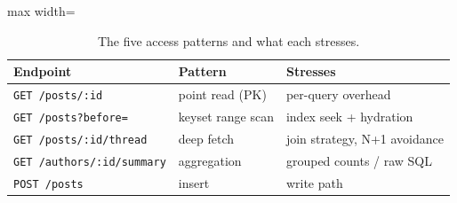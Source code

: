 \begin{table}[htbp]
  \centering
  \caption{The five access patterns and what each stresses.}
  \label{tab:patterns}
  \begin{adjustbox}{max width=\textwidth}
  \begin{tabular}{l l l}
    \toprule
    Endpoint & Pattern & Stresses \\
    \midrule
    \texttt{GET /posts/:id}          & point read (PK)       & per-query overhead \\
    \texttt{GET /posts?before=}      & keyset range scan     & index seek + hydration \\
    \texttt{GET /posts/:id/thread}   & deep fetch     & join strategy, N+1 avoidance \\
    \texttt{GET /authors/:id/summary}& aggregation           & grouped counts / raw SQL \\
    \texttt{POST /posts}             & insert                & write path \\
    \bottomrule
  \end{tabular}
  \end{adjustbox}
\end{table}
